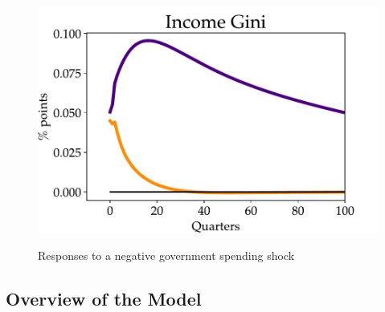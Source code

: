 \begin{figure}[!t]
\begin{center}
\begin{minipage}{0.5\textwidth}
\end{minipage}\hspace*{\fill}
\begin{minipage}{0.5\textwidth}
\includegraphics[scale=.5]{text/Chapter1/Figures/Fiscal_Consolidation/gini_FC}
\end{minipage}
\caption{Responses to a negative government spending shock} 

\label{Fiscal_Consolidation}
\end{center}
\end{figure}



\subsection{Overview of the Model}

